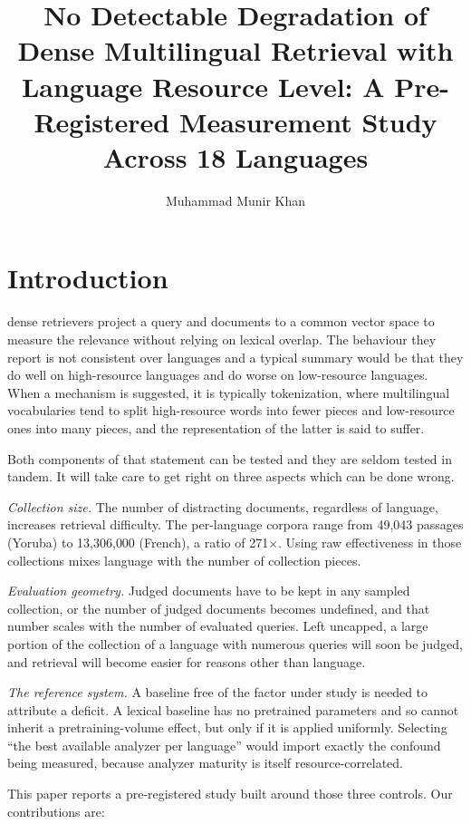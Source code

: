 \documentclass{ijimai_article}
\title{No Detectable Degradation of Dense Multilingual Retrieval with
Language Resource Level: A Pre-Registered Measurement Study Across 18 Languages}
\author{Muhammad Munir Khan}
\affiliation{Independent Researcher, Islamabad, Pakistan (ORCID: 0009-0005-4071-9217)}
\begin{document}
\maketitle

\section{Introduction}

 dense retrievers project a query and documents to a common
vector space to measure the relevance without relying on lexical overlap. The behaviour
they report is not consistent over languages and a typical summary would be that they
do well on high-resource languages and do worse on low-resource languages. When a
mechanism is suggested, it is typically tokenization, where multilingual vocabularies
tend to split high-resource words into fewer pieces and low-resource ones into many
pieces, and the representation of the latter is said to suffer.

Both components of that statement can be tested and they are seldom tested in tandem.
It will take care to get right on three aspects which can be done wrong.

\emph{Collection size.} The number of distracting documents, regardless of language,
increases retrieval difficulty. The per-language corpora range from 49{,}043 passages
(Yoruba) to 13{,}306{,}000 (French), a ratio of 271$\times$. Using raw effectiveness in
those collections mixes language with the number of collection pieces.

\emph{Evaluation geometry.} Judged documents have to be kept in any sampled collection,
or the number of judged documents becomes undefined, and that number scales with the
number of evaluated queries. Left uncapped, a large portion of the collection of a
language with numerous queries will soon be judged, and retrieval will become easier
for reasons other than language.

\emph{The reference system.} A baseline free of the factor under study is needed to
attribute a deficit. A lexical baseline has no pretrained parameters and so cannot
inherit a pretraining-volume effect, but only if it is applied uniformly. Selecting
``the best available analyzer per language'' would import exactly the confound being
measured, because analyzer maturity is itself resource-correlated.

This paper reports a pre-registered study built around those three controls. Our
contributions are:
\end{document}
